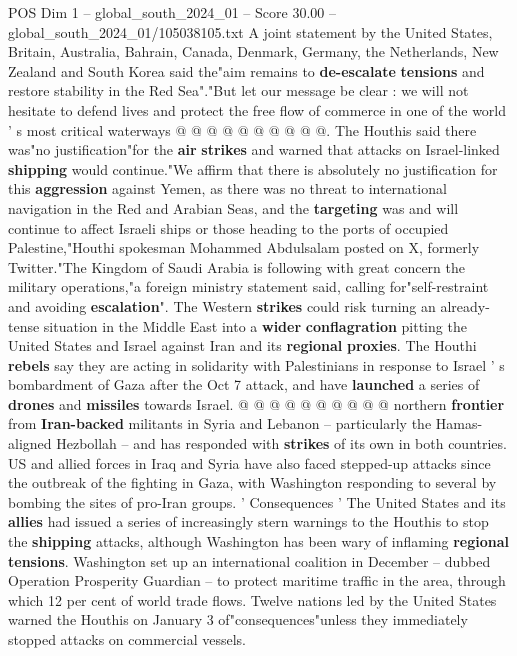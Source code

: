 \begin{textsample}{POS Dim 1 – global\_south\_2024\_01 – Score 30.00 – global\_south\_2024\_01/105038105.txt}
A joint statement by the United States, Britain, Australia, Bahrain, Canada, Denmark, Germany, the Netherlands, New Zealand and South Korea said the"aim remains to \textbf{de-escalate} \textbf{tensions} and restore stability in the Red Sea"."But let our message be clear : we will not hesitate to defend lives and protect the free flow of commerce in one of the world ' s most critical waterways @ @ @ @ @ @ @ @ @ @.
The Houthis said there was"no justification"for the \textbf{air} \textbf{strikes} and warned that attacks on Israel-linked \textbf{shipping} would continue."We affirm that there is absolutely no justification for this \textbf{aggression} against Yemen, as there was no threat to international navigation in the Red and Arabian Seas, and the \textbf{targeting} was and will continue to affect Israeli ships or those heading to the ports of occupied Palestine,"Houthi spokesman Mohammed Abdulsalam posted on X, formerly Twitter."The Kingdom of Saudi Arabia is following with great concern the military operations,"a foreign ministry statement said, calling for"self-restraint and avoiding \textbf{escalation}".
The Western \textbf{strikes} could risk turning an already-tense situation in the Middle East into a \textbf{wider} \textbf{conflagration} pitting the United States and Israel against Iran and its \textbf{regional} \textbf{proxies}.
The Houthi \textbf{rebels} say they are acting in solidarity with Palestinians in response to Israel ' s bombardment of Gaza after the Oct 7 attack, and have \textbf{launched} a series of \textbf{drones} and \textbf{missiles} towards Israel. @ @ @ @ @ @ @ @ @ @ northern \textbf{frontier} from \textbf{Iran-backed} militants in Syria and Lebanon -- particularly the Hamas-aligned Hezbollah -- and has responded with \textbf{strikes} of its own in both countries.
US and allied forces in Iraq and Syria have also faced stepped-up attacks since the outbreak of the fighting in Gaza, with Washington responding to several by bombing the sites of pro-Iran groups. ' Consequences ' The United States and its \textbf{allies} had issued a series of increasingly stern warnings to the Houthis to stop the \textbf{shipping} attacks, although Washington has been wary of inflaming \textbf{regional} \textbf{tensions}.
Washington set up an international coalition in December -- dubbed Operation Prosperity Guardian -- to protect maritime traffic in the area, through which 12 per cent of world trade flows.
Twelve nations led by the United States warned the Houthis on January 3 of"consequences"unless they immediately stopped attacks on commercial vessels.

\end{textsample}
